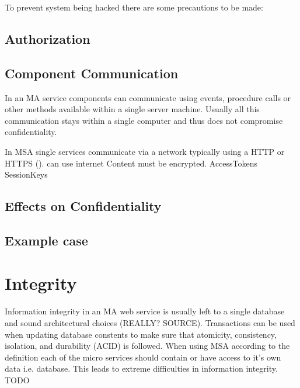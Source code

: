 \begin{sloppypar}
    To prevent system being hacked there are some precautions to be made:
\end{sloppypar}
    

\subsection{Authorization}
\begin{sloppypar}

\end{sloppypar}



\subsection{Component Communication}
\begin{sloppypar}
    In an MA service components can communicate using events, 
    procedure calls or other methods available within a single server machine. 
    Usually all this communication stays within a single computer and thus does not compromise confidentiality.

    In MSA single services communicate via a network typically using a HTTP or HTTPS (). 
    can use internet
    Content must be encrypted.
    AccessTokens
    SessionKeys




\end{sloppypar}

\subsection{Effects on Confidentiality}


\subsection{Example case}

\section{Integrity}
\begin{sloppypar}
    Information integrity in an MA web service is usually left to a single database 
    and sound architectural choices (REALLY? SOURCE).
    Transactions can be used when updating database constents to make sure that
    atomicity, consistency, isolation, and durability (ACID) \citep{acid} is followed.
    When using MSA according to the definition each of the micro services should contain 
    or have access to it's own data i.e. database. This leads to extreme difficulties in information integrity.
    TODO
\end{sloppypar}


